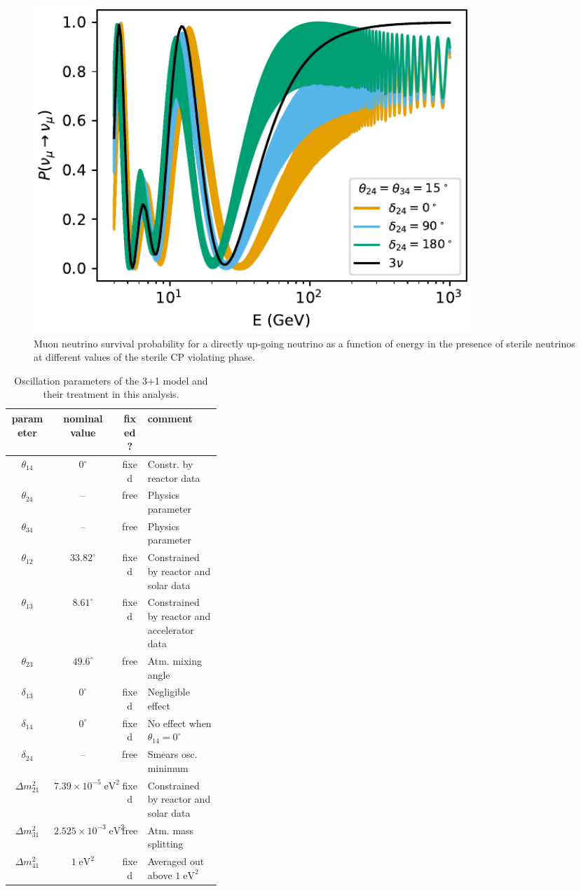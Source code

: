 \begin{figure}
    \centering
    \includegraphics[width=0.8\textwidth]{figures/measurement/sterile_analysis/physics/oscillation_bands.pdf}
    \caption{Muon neutrino survival probability for a directly up-going neutrino as a function of energy in the presence of sterile neutrinos at different values of the sterile CP violating phase.}
    \label{fig:sterile-cp-phase-effect}
\end{figure}

\begin{table}
    \centering
    \begin{tabular}{@{}cccp{0.35 \linewidth}@{}}\toprule
        \textbf{parameter} & \textbf{nominal value} & \textbf{fixed?} & \textbf{comment} \\
        \midrule
        $\theta_{14}$ & $0^\circ$ & fixed &  Constr. by reactor data \\
        $\theta_{24}$ & -- & free & Physics parameter\\
        $\theta_{34}$ & -- & free & Physics parameter\\
        $\theta_{12}$ & $33.82^\circ$ & fixed & Constrained by reactor and solar data \\
        $\theta_{13}$ & $8.61^\circ$ & fixed & Constrained by reactor and accelerator data \\
        $\theta_{23}$ & $49.6^\circ$ & free & Atm. mixing angle \\
        $\delta_{13}$ & $0^\circ$ & fixed &  Negligible effect \\
        $\delta_{14}$ & $0^\circ$ & fixed &  No effect when $\theta_{14} = 0^\circ$ \\
        $\delta_{24}$ & -- & free & Smears osc. minimum \\
        $\Delta m^2_{21}$ & $7.39\times10^{-5}\;\mathrm{eV^2}$ & fixed & Constrained by reactor and solar data \\
        $\Delta m^2_{31}$ & $2.525\times10^{-3}\;\mathrm{eV^2}$ & free & Atm. mass splitting \\
        $\Delta m^2_{41}$ & $1\;\mathrm{eV^2}$ & fixed & Averaged out above $1\;\mathrm{eV^2}$ \\
        \bottomrule
    \end{tabular}
    \caption{Oscillation parameters of the 3+1 model and their treatment in this analysis.}
    \label{tab:oscillation-parameters}
\end{table}

